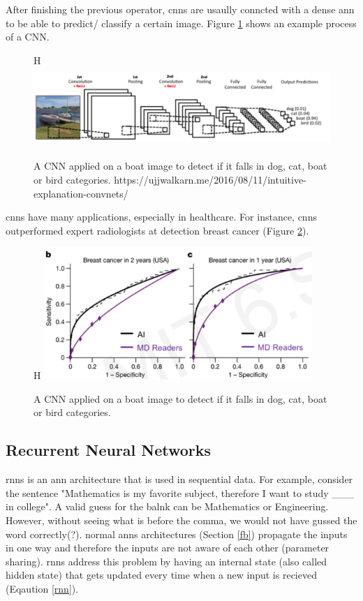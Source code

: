 \documentclass[runningheads]{llncs}
\begin{document}
After finishing the previous operator, \gls{cnns} are usaully conncted with 
a dense \gls{ann} to be able to predict/ classify a certain image. Figure \ref{dcnnp} 
shows an example process of a CNN.

\begin{figure}{H}
    \label{dcnnp}
    \centering
    \includegraphics[height=3cm]{dcnnp}
    \caption{A CNN applied on a boat image to detect if it falls in 
    dog, cat, boat or bird categories.
    https://ujjwalkarn.me/2016/08/11/intuitive-explanation-convnets/}
\end{figure}

\gls{cnns} have many applications, especially in healthcare. For instance, 
\gls{cnns} outperformed expert radiologists at detection breast cancer \cite{mckinney2020international} (Figure \ref{can}).

\begin{figure}{H}
    \label{can}
    \centering
    \includegraphics[height=5cm]{cancer}
    \caption{A CNN applied on a boat image to detect if it falls in 
    dog, cat, boat or bird categories.}
\end{figure}


\subsection{Recurrent Neural Networks}

\gls{rnns} is an \gls{ann} architecture that is used in sequential data.
For example, consider the sentence "Mathematics is my favorite subject, therefore I want to study \_\_\_ in college".
A valid guess for the balnk can be Mathematics or Engineering. However, without seeing
what is before the comma, we would not have gussed the word correctly(?).
normal \gls{anns} architectures (Section \ref{fb}) propagate the inputs in one way and therefore 
the inputs are not aware of each other (parameter sharing).
\gls{rnns} address this problem by having an internal state (also called hidden state) that gets 
updated every time when a new input is recieved (Eqaution \ref{rnn}). 
\end{document}
